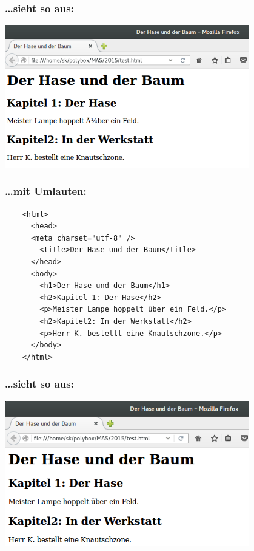 \begin{frame}
\frametitle{\ldots sieht so aus:}
  \begin{center}
    \includegraphics[width=0.8\textwidth]{pics/testseite.png}
  \end{center}
\end{frame}

\begin{frame}[fragile]
\frametitle{\ldots mit Umlauten:}
  \begin{lstlisting}
    <html>
      <head>
      <meta charset="utf-8" />
        <title>Der Hase und der Baum</title>
      </head>
      <body>
        <h1>Der Hase und der Baum</h1>
        <h2>Kapitel 1: Der Hase</h2>
        <p>Meister Lampe hoppelt über ein Feld.</p>
        <h2>Kapitel2: In der Werkstatt</h2>
        <p>Herr K. bestellt eine Knautschzone.</p>
      </body>
    </html>
  \end{lstlisting}
\end{frame}

\begin{frame}
\frametitle{\ldots sieht so aus:}
  \begin{center}
    \includegraphics[width=0.8\textwidth]{pics/testseite-utf8.png}
  \end{center}
\end{frame}

